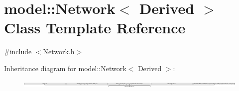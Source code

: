 \hypertarget{classmodel_1_1_network}{}\section{model\+:\+:Network$<$ Derived $>$ Class Template Reference}
\label{classmodel_1_1_network}


{\ttfamily \#include $<$Network.\+h$>$}

Inheritance diagram for model\+:\+:Network$<$ Derived $>$\+:\begin{figure}[H]
\begin{center}
\leavevmode
\includegraphics[height=0.323232cm]{classmodel_1_1_network}
\end{center}
\end{figure}
